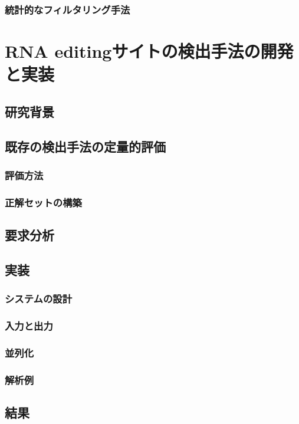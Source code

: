 \subsection{統計的なフィルタリング手法}


\chapter{RNA editingサイトの検出手法の開発と実装}

\section{研究背景}

\section{既存の検出手法の定量的評価}
\subsection{評価方法}
\subsection{正解セットの構築}





\section{要求分析}

\section{実装}
\subsection{システムの設計}
\subsection{入力と出力}
\subsection{並列化}
\subsection{解析例}

\section{結果}
